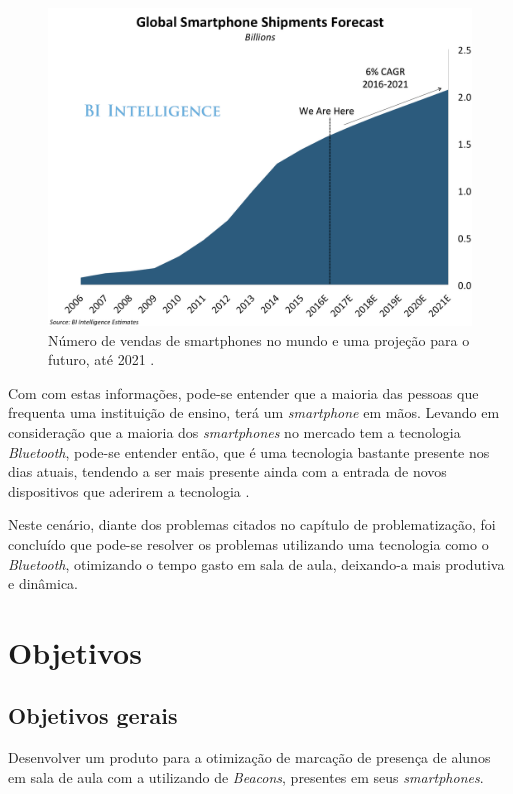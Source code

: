 \documentclass[
	12pt,
	oneside,
	a4paper,
	english,
	brazil,
]{abntex2}
\begin{document}
\begin{figure}[h]
\centering
\includegraphics[width=1.0\textwidth]{smartphone_sales}
    \caption{
        Número de vendas de smartphones no mundo e uma projeção para o futuro, até 2021 \cite{smartphone-numbers-image}.
    }
\end{figure}

Com com estas informações, pode-se entender que a maioria das pessoas que frequenta uma instituição de ensino, terá um \emph{smartphone} em mãos. Levando em consideração que a maioria dos \emph{smartphones} no mercado tem a tecnologia \emph{Bluetooth}, pode-se entender então, que é uma tecnologia bastante presente nos dias atuais, tendendo a ser mais presente ainda com a entrada de novos dispositivos que aderirem a tecnologia \cite{bluetooth-devices}.

Neste cenário, diante dos problemas citados no capítulo de problematização, foi concluído que pode-se resolver os problemas utilizando uma tecnologia como o \emph{Bluetooth}, otimizando o tempo gasto em sala de aula, deixando-a mais produtiva e dinâmica.



\chapter{Objetivos}

\section{Objetivos gerais}
Desenvolver um produto para a otimização de marcação de presença de alunos em sala de aula com a utilizando de \emph{Beacons}, presentes em seus \emph{smartphones}.
\end{document}

